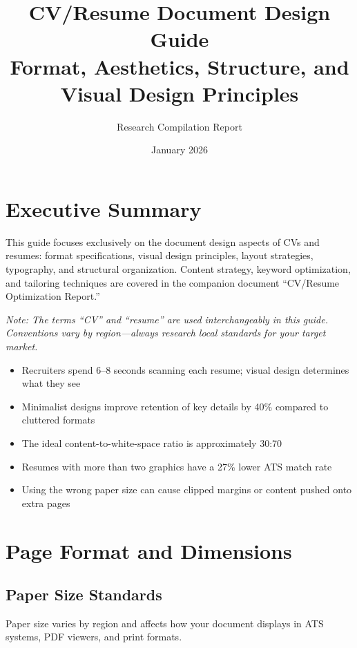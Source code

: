 \documentclass[11pt,a4paper]{article}
\title{\textbf{CV/Resume Document Design Guide}\\[0.5em]
\large Format, Aesthetics, Structure, and Visual Design Principles}
\author{Research Compilation Report}
\date{January 2026}
\begin{document}
\maketitle
\tableofcontents
\newpage

\section{Executive Summary}

This guide focuses exclusively on the document design aspects of CVs and resumes: format specifications, visual design principles, layout strategies, typography, and structural organization. Content strategy, keyword optimization, and tailoring techniques are covered in the companion document ``CV/Resume Optimization Report.''

\textit{Note: The terms ``CV'' and ``resume'' are used interchangeably in this guide. Conventions vary by region---always research local standards for your target market.}

\begin{keystat}
\begin{itemize}[noitemsep]
    \item Recruiters spend 6--8 seconds scanning each resume; visual design determines what they see
    \item Minimalist designs improve retention of key details by 40\% compared to cluttered formats
    \item The ideal content-to-white-space ratio is approximately 30:70
    \item Resumes with more than two graphics have a 27\% lower ATS match rate
    \item Using the wrong paper size can cause clipped margins or content pushed onto extra pages
\end{itemize}
\end{keystat}

\section{Page Format and Dimensions}

\subsection{Paper Size Standards}

Paper size varies by region and affects how your document displays in ATS systems, PDF viewers, and print formats.
\end{document}
